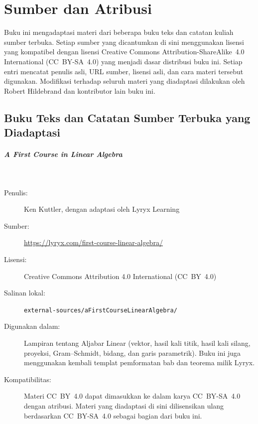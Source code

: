 \chapter*{Sumber dan Atribusi}

Buku ini mengadaptasi materi dari beberapa buku teks dan catatan kuliah
sumber terbuka. Setiap sumber yang dicantumkan di sini menggunakan lisensi
yang kompatibel dengan lisensi Creative Commons Attribution-ShareAlike~4.0
International (CC~BY-SA~4.0) yang menjadi dasar distribusi buku ini. Setiap
entri mencatat penulis asli, URL sumber, lisensi asli, dan cara materi tersebut
digunakan. Modifikasi terhadap seluruh materi yang diadaptasi dilakukan oleh
Robert Hildebrand dan kontributor lain buku ini.

\section*{Buku Teks dan Catatan Sumber Terbuka yang Diadaptasi}

\paragraph{A First Course in Linear Algebra}\hspace{0pt}\\[-0.6em]
\begin{description}
  \item[Penulis:] Ken Kuttler, dengan adaptasi oleh Lyryx Learning
  \item[Sumber:] \url{https://lyryx.com/first-course-linear-algebra/}
  \item[Lisensi:] Creative Commons Attribution 4.0 International (CC~BY~4.0)
  \item[Salinan lokal:] \texttt{external-sources/aFirstCourseLinearAlgebra/}
  \item[Digunakan dalam:] Lampiran tentang Aljabar Linear (vektor, hasil
    kali titik, hasil kali silang, proyeksi, Gram--Schmidt, bidang, dan
    garis parametrik). Buku ini juga menggunakan kembali templat
    pemformatan bab dan teorema milik Lyryx.
  \item[Kompatibilitas:] Materi CC~BY~4.0 dapat dimasukkan ke dalam karya
    CC~BY-SA~4.0 dengan atribusi. Materi yang diadaptasi di sini
    dilisensikan ulang berdasarkan CC~BY-SA~4.0 sebagai bagian dari buku ini.
\end{description}

